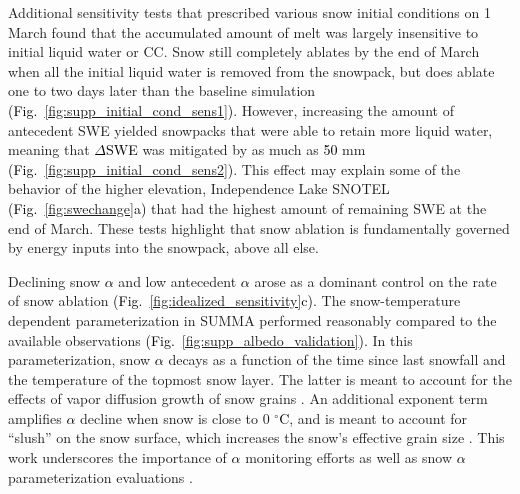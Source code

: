 \documentclass[draft]{agujournal2019}
\newcommand{\fig}[2]{\textcolor{black}{(Fig.~\ref{#1}{#2})}}   %
\newcommand{\mynum}[1]{\textcolor{black}{#1}}
\newcommand{\albedo}{\textcolor{black}{$\alpha$}\xspace}
\newcommand{\dswe}{\textcolor{black}{$\Delta$SWE}\xspace}
\newcommand{\degrc}{\textcolor{black}{$^\circ$C}\xspace}
\begin{document}
Additional sensitivity tests that prescribed various snow initial conditions on 1 March found that the accumulated amount of melt was largely insensitive to initial liquid water or CC.
Snow still completely ablates by the end of March when all the initial liquid water is removed from the snowpack, but does ablate one to two days later than the baseline simulation \fig{fig:supp_initial_cond_sens1}{}.
However, increasing the amount of antecedent SWE yielded snowpacks that were able to retain more liquid water, meaning that \dswe was mitigated by as much as \mynum{50} mm \fig{fig:supp_initial_cond_sens2}{}. 
This effect may explain some of the behavior of the higher elevation, Independence Lake SNOTEL \fig{fig:swechange}{a} that had the highest amount of remaining SWE at the end of March. 
These tests highlight that snow ablation is fundamentally governed by energy inputs into the snowpack, above all else. 

Declining snow \albedo and low antecedent \albedo arose as a dominant control on the rate of snow ablation \fig{fig:idealized_sensitivity}{c}.
The snow-temperature dependent parameterization in SUMMA performed reasonably compared to the available observations \fig{fig:supp_albedo_validation}{}.
In this parameterization, snow \albedo decays as a function of the time since last snowfall and the temperature of the topmost snow layer.
The latter is meant to account for the effects of vapor diffusion growth of snow grains \cite{Colbeck1982-gv}. 
An additional exponent term amplifies \albedo decline when snow is close to 0 \degrc, and is meant to account for ``slush'' on the snow surface, which increases the snow's effective grain size \cite{Warren1982-pc}. 
This work underscores the importance of \albedo monitoring efforts \cite{Bair2021-spires, Painter2016-gk} as well as snow \albedo parameterization evaluations \cite{Abolafia-Rosenzweig2022-qk}. 
\end{document}
